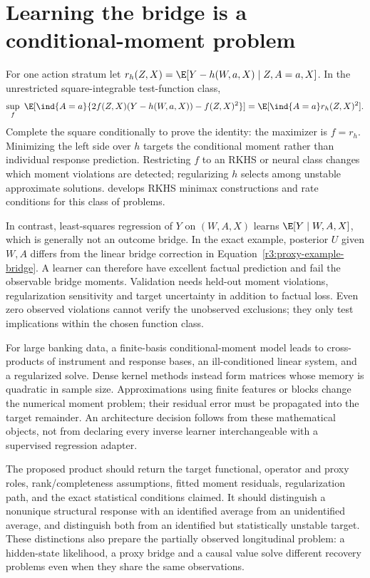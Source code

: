 \section{Learning the bridge is a conditional-moment problem}
\label{r3:bridge-learning}
For one action stratum let
$r_h(Z,X)=\E[Y-h(W,a,X)\mid Z,A=a,X]$. In the unrestricted
square-integrable test-function class,
\begin{align}
 \sup_f\ \E[\ind\{A=a\}
       \{2f(Z,X)(Y-h(W,a,X))-f(Z,X)^2\}]
 =\E[\ind\{A=a\}r_h(Z,X)^2].
 \label{r3:minimax-moment}
\end{align}
Complete the square conditionally to prove the identity: the maximizer
is $f=r_h$. Minimizing the left side over $h$ targets the conditional
moment rather than individual response prediction. Restricting $f$ to
an RKHS or neural class changes which moment violations are detected;
regularizing $h$ selects among unstable approximate solutions.
\citet[Sections 3 and 5]{ghassami2022} develops RKHS minimax
constructions and rate conditions for this class of problems.

In contrast, least-squares regression of $Y$ on $(W,A,X)$ learns
$\E[Y\mid W,A,X]$, which is generally not an outcome bridge. In
the exact example, posterior $U$ given $W,A$ differs from the linear
bridge correction in Equation~\eqref{r3:proxy-example-bridge}. A
learner can therefore have excellent factual prediction and fail the
observable bridge moments. Validation needs held-out moment violations,
regularization sensitivity and target uncertainty in addition to factual
loss. Even zero observed violations cannot verify the unobserved
exclusions; they only test implications within the chosen function class.

For large banking data, a finite-basis conditional-moment model leads to
cross-products of instrument and response bases, an ill-conditioned
linear system, and a regularized solve. Dense kernel methods instead
form matrices whose memory is quadratic in sample size. Approximations
using finite features or blocks change the numerical moment problem;
their residual error must be propagated into the target remainder.
An architecture decision follows from these mathematical objects,
not from declaring every inverse learner interchangeable with a
supervised regression adapter.

The proposed product should return the target functional, operator and
proxy roles, rank/completeness assumptions, fitted moment residuals,
regularization path, and the exact statistical conditions claimed.
It should distinguish a nonunique structural response with an identified
average from an unidentified average, and distinguish both from an
identified but statistically unstable target. These distinctions also
prepare the partially observed longitudinal problem: a hidden-state
likelihood, a proxy bridge and a causal value solve different recovery
problems even when they share the same observations.


